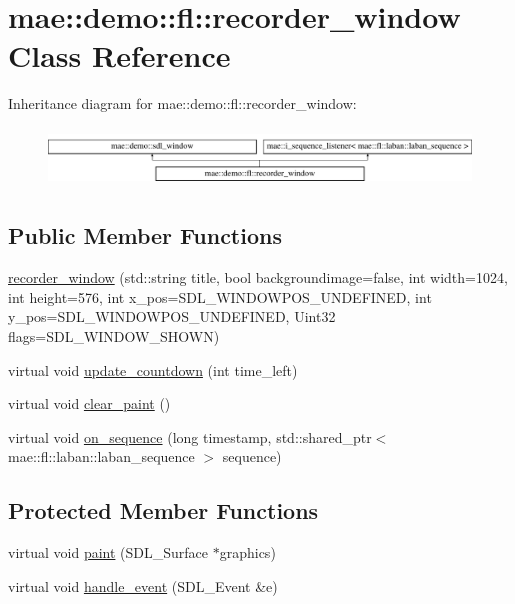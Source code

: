 \hypertarget{classmae_1_1demo_1_1fl_1_1recorder__window}{\section{mae\-:\-:demo\-:\-:fl\-:\-:recorder\-\_\-window Class Reference}
\label{classmae_1_1demo_1_1fl_1_1recorder__window}
}
Inheritance diagram for mae\-:\-:demo\-:\-:fl\-:\-:recorder\-\_\-window\-:\begin{figure}[H]
\begin{center}
\leavevmode
\includegraphics[height=1.573034cm]{classmae_1_1demo_1_1fl_1_1recorder__window}
\end{center}
\end{figure}
\subsection*{Public Member Functions}
\begin{DoxyCompactItemize}
\item 
\hyperlink{classmae_1_1demo_1_1fl_1_1recorder__window_a1dcfdfb8593efeac945b182a47c506c0}{recorder\-\_\-window} (std\-::string title, bool backgroundimage=false, int width=1024, int height=576, int x\-\_\-pos=S\-D\-L\-\_\-\-W\-I\-N\-D\-O\-W\-P\-O\-S\-\_\-\-U\-N\-D\-E\-F\-I\-N\-E\-D, int y\-\_\-pos=S\-D\-L\-\_\-\-W\-I\-N\-D\-O\-W\-P\-O\-S\-\_\-\-U\-N\-D\-E\-F\-I\-N\-E\-D, Uint32 flags=S\-D\-L\-\_\-\-W\-I\-N\-D\-O\-W\-\_\-\-S\-H\-O\-W\-N)
\item 
virtual void \hyperlink{classmae_1_1demo_1_1fl_1_1recorder__window_a2025de4acaea6121fe24baf340f4d7ce}{update\-\_\-countdown} (int time\-\_\-left)
\item 
virtual void \hyperlink{classmae_1_1demo_1_1fl_1_1recorder__window_a78ae661b3078f116b0b9cd80c0aac053}{clear\-\_\-paint} ()
\item 
virtual void \hyperlink{classmae_1_1demo_1_1fl_1_1recorder__window_a33b7253a227732d174513fecd312844b}{on\-\_\-sequence} (long timestamp, std\-::shared\-\_\-ptr$<$ mae\-::fl\-::laban\-::laban\-\_\-sequence $>$ sequence)
\end{DoxyCompactItemize}
\subsection*{Protected Member Functions}
\begin{DoxyCompactItemize}
\item 
virtual void \hyperlink{classmae_1_1demo_1_1fl_1_1recorder__window_a8f3e432809d394355c6a78398bba74c1}{paint} (S\-D\-L\-\_\-\-Surface $\ast$graphics)
\item 
virtual void \hyperlink{classmae_1_1demo_1_1fl_1_1recorder__window_ac937214271dbb036343530321e2762b7}{handle\-\_\-event} (S\-D\-L\-\_\-\-Event \&e)
\end{DoxyCompactItemize}
